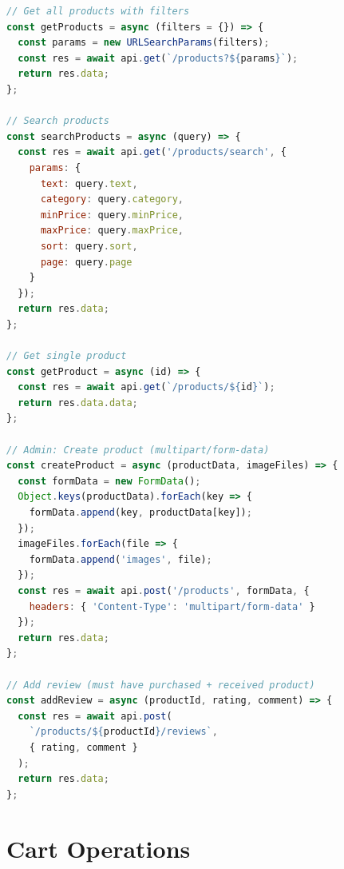 \begin{lstlisting}[language=JavaScript,title=Product API Calls]
// Get all products with filters
const getProducts = async (filters = {}) => {
  const params = new URLSearchParams(filters);
  const res = await api.get(`/products?${params}`);
  return res.data;
};

// Search products
const searchProducts = async (query) => {
  const res = await api.get('/products/search', {
    params: {
      text: query.text,
      category: query.category,
      minPrice: query.minPrice,
      maxPrice: query.maxPrice,
      sort: query.sort,
      page: query.page
    }
  });
  return res.data;
};

// Get single product
const getProduct = async (id) => {
  const res = await api.get(`/products/${id}`);
  return res.data.data;
};

// Admin: Create product (multipart/form-data)
const createProduct = async (productData, imageFiles) => {
  const formData = new FormData();
  Object.keys(productData).forEach(key => {
    formData.append(key, productData[key]);
  });
  imageFiles.forEach(file => {
    formData.append('images', file);
  });
  const res = await api.post('/products', formData, {
    headers: { 'Content-Type': 'multipart/form-data' }
  });
  return res.data;
};

// Add review (must have purchased + received product)
const addReview = async (productId, rating, comment) => {
  const res = await api.post(
    `/products/${productId}/reviews`,
    { rating, comment }
  );
  return res.data;
};
\end{lstlisting}

\section{Cart Operations}

